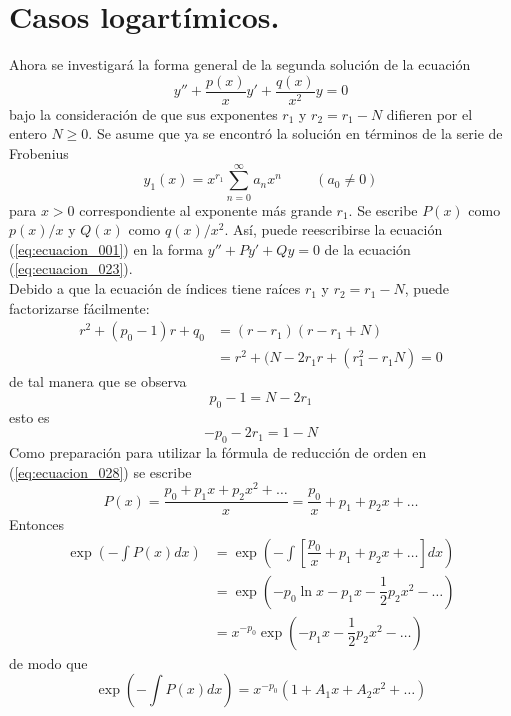 \section{Casos logartímicos.}
Ahora se investigará la forma general de la segunda solución de la ecuación
\begin{equation}
y'' + \dfrac{p(x)}{x} y' + \dfrac{q(x)}{x^{2}} y = 0
\label{eq:ecuacion_001}
\end{equation}
bajo la consideración de que sus exponentes $r_{1}$ y $r_{2} = r_{1} - N$ difieren por el entero $N \geq 0$. Se asume que ya se encontró la solución en términos de la serie de Frobenius
\begin{equation}
y_{1}(x) = x^{r_{1}} \sum_{n=0}^{\infty} a_{n} x^{n} \hspace{1cm} (a_{0} \neq 0)
\label{eq:ecuacion_029}
\end{equation}
para $x > 0$ correspondiente al exponente más grande $r_{1}$. Se escribe $P(x)$ como $p(x)/x$ y $Q(x)$ como $q(x)/x^{2}$. Así, puede reescribirse la ecuación (\ref{eq:ecuacion_001}) en la forma $y'' + P y' + Q y = 0$ de la ecuación (\ref{eq:ecuacion_023}).
\\
Debido a que la ecuación de índices tiene raíces $r_{1}$ y $r_{2} = r_{1} - N$, puede factorizarse fácilmente:
\[ \begin{split}
r^{2} + (p_{0} - 1) r + q_{0} &= (r -r_{1})(r - r_{1} + N) \\
&= r^{2} + (N- 2 r_{1} r + (r_{1}^{2} - r_{1} N) = 0
\end{split} \]
de tal manera que se observa
\[ p_{0} -1 = N - 2 r_{1} \]
esto es
\begin{equation}
-p_{0} - 2 r_{1} =  1 - N
\label{eq:ecuacion_030}
\end{equation}
Como preparación para utilizar la fórmula de reducción de orden en (\ref{eq:ecuacion_028}) se escribe
\[ P(x) = \dfrac{p_{0} + p_{1} x + p_{2} x^{2} + \ldots }{x} = \dfrac{p_{0}}{x} + p_{1} + p_{2} x + \ldots \]
Entonces
\[ \begin{split}
\exp \left( - \int P(x) dx \right) &= \exp \left( - \int \left[ \dfrac{p_{0}}{x} + p_{1} + p_{2} x + \ldots \right] dx \right) \\
&= \exp (- p_{0} \ln x - p_{1} x - \dfrac{1}{2} p_{2} x^{2} - \ldots ) \\
&= x^{-p_{0}} \exp(- p_{1} x - \dfrac{1}{2} p_{2} x^{2} - \ldots)
\end{split} \]
de modo que
\begin{equation}
\exp \left( - \int P(x) dx \right) =  x^{-p_{0}} (1 + A_{1} x + A_{2} x^{2} + \ldots )
\label{eq:ecuacion_031}
\end{equation}
